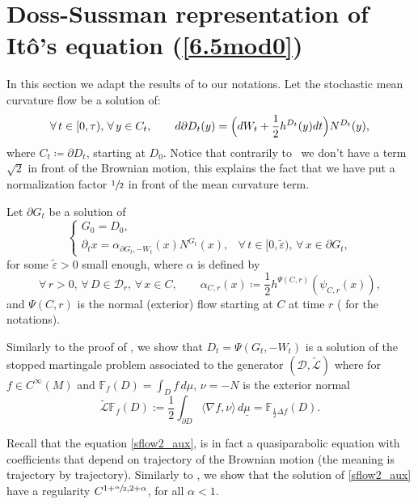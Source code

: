 \documentclass[JEP,XML,SOM,Unicode,NoFloatCountersInSection,published]{cedram}
\let\epsilon\varepsilon
\theoremstyle{plain}
\theoremstyle{definition}
\newcommand\df{\coloneqq}
\newcommand{\bqn}[1]{\begin{equation}\label{#1}}
\newcommand{\bqq}[1]{\begin{equation}}
\newcommand{\eqn}{\end{equation}}
\newcommand{\fo}{\forall\,}
\let\f\frac
\let\pa\partial
\let\wi\widetilde
\newcommand{\cD}{\mathcal{D}}
\begin{document}
\section{Doss-Sussman representation of Itô's equation (\ref{6.5mod0})}
\label{appC}

In this section we adapt the results of \cite{zbMATH07470497} to our notations.
Let the stochastic mean curvature flow be a solution of:
\bqn{sflow}
\fo t\in[0,\tau),\,\fo y\in C_t, \qquad d \partial D_t(y)=\Bigl(dW_t+\f12 h^{D_t}(y)dt\Bigr)N^{D_t}(y),
\eqn
where $C_t\df\pa D_t$, starting at $D_0$.
Notice that contrarily to~\cite{zbMATH07470497} we don't have a term~$\sqrt2$ in front of the Brownian motion, this explains the fact that we have put a normalization factor $\sfrac12$ in front of the mean curvature term.

Let $\partial G_t$ be a solution of
\bqn{sflow2_aux}
\begin{cases}
G_0=D_0,\\
\pa_t x=\alpha_{\pa G_t,-W_t}(x)N^{G_t}(x),&\fo t\in[0,\wi\epsilon),\,\fo x\in \partial G_t,
\end{cases}
\eqn
for some $\wi\epsilon>0$ small enough, where $\alpha$ is defined by
\bqq{alpharhobeta}
\fo r>0,\,\fo D\in\cD_r,\,\fo x\in C,\qquad \alpha_{C,r}(x)\df \f12h^{\Psi(C,r)}(\psi_{C,r}(x)),
\eqn
and $\Psi(C,r)$ is the normal (exterior) flow starting at $C$ at time $r$ (\cf \cite[Chap.\,3 \& 4]{zbMATH07470497} for the notations).

Similarly to the proof of \cite[Th.\,17]{zbMATH07470497}, we show that $D_t = \Psi(G_t,-W_t)$ is a solution of the stopped martingale problem associated to the generator $(\mathcal{D},\wi{\mathcal{L}})$ where for $f \in C^{\infty}(M) $ and $ \mathbb{F}_f (D) = \int_D f \,d\mu$, $\nu = -N $ is the exterior normal
\[
\wi{\mathcal{L}} \mathbb{F}_f (D):= \frac12 \int_{\partial D} \langle \nabla f, \nu \rangle \,d\underline{\mu} = \mathbb{F}_{\frac12 \Delta f}(D).
\]


Recall that the equation \eqref{sflow2_aux}, is in fact a quasiparabolic equation with coefficients that depend on trajectory of the Brownian motion (the meaning is trajectory by trajectory). Similarly to \cite[\S 4.1]{zbMATH07470497}, we show that the solution of \eqref{sflow2_aux} have a regularity $ C^{1+\sfrac{\alpha}{2},2 + \alpha}$, for all $\alpha < 1. $
\end{document}
